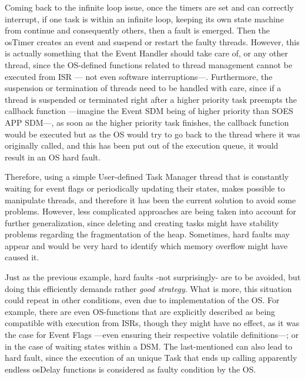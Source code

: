 Coming back to the infinite loop issue, once the timers are set and can correctly interrupt, if one task is within an infinite loop, keeping its own 
state machine from continue and consequently others, then a fault is emerged. Then the osTimer creates an event and suspend or restart the faulty threads.
However, this is actually something that the Event Handler should take care of, or any other thread, since the OS-defined functions
related to thread management cannot be executed from ISR — not even software interruptions—. Furthermore, the suspension or termination of
threads need to be handled with care, since if a thread is suspended or terminated right after a higher priority task preempts the callback
function —imagine the Event SDM being of higher priority than SOES APP SDM—, as soon as the higher priority task finishes, the callback 
function would be executed but as the OS would try to
go back to the thread where it was originally called, and this has been put out of the execution queue, it would result in an OS hard fault.

Therefore, using a simple User-defined Task Manager thread that is constantly waiting for event flags or periodically updating their states, 
makes possible to manipulate threads, and therefore it has been the current solution to avoid some problems. However, 
less complicated approaches are being taken
into account for further generalization, since deleting and creating tasks might have stability problems regarding the fragmentation
of the heap. Sometimes, hard faults may appear and would be very hard to identify which memory overflow might have caused it.

Just as the previous example, hard faults -not surprisingly- are to be avoided, but doing this efficiently demands rather \emph{good strategy}.
What is more, this situation could repeat in other conditions, even due to implementation of the OS. For example, there are even 
OS-functions that are explicitly described as being compatible with execution from ISRs, though they might have no effect, as it was the 
case for Event Flags 
—even ensuring
their respective volatile definitions—; or in the case of waiting states within a DSM. The last-mentioned can also lead to hard fault, 
since the execution of an unique Task 
that ends up calling apparently endless osDelay functions is considered as faulty condition by the OS.

